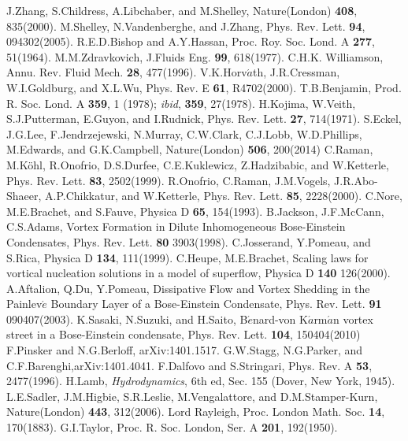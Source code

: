 \documentclass[12pt,a4paper]{report} %
\begin{document}
\begin{thebibliography}{81}
 J.Zhang, S.Childress, A.Libchaber, and M.Shelley, Nature(London) {\bf 408}, 835(2000).
 M.Shelley, N.Vandenberghe, and J.Zhang, Phys. Rev. Lett. {\bf 94}, 094302(2005).
 R.E.D.Bishop and A.Y.Hassan, Proc. Roy. Soc. Lond. A {\bf 277}, 51(1964).
 M.M.Zdravkovich, J.Fluids Eng. {\bf 99}, 618(1977).
 C.H.K. Williamson, Annu. Rev. Fluid Mech. {\bf 28}, 477(1996).
 V.K.Horv$\acute{a}$th, J.R.Cressman, W.I.Goldburg, and X.L.Wu, Phys. Rev. E {\bf 61}, R4702(2000).
 T.B.Benjamin, Prod. R. Soc. Lond. A {\bf 359}, 1 (1978); {\it ibid}, {\bf 359}, 27(1978).
 H.Kojima, W.Veith, S.J.Putterman, E.Guyon, and I.Rudnick, Phys. Rev. Lett. {\bf 27}, 714(1971).
 S.Eckel, J.G.Lee, F.Jendrzejewski, N.Murray, C.W.Clark, C.J.Lobb, W.D.Phillips, M.Edwards, and G.K.Campbell, Nature(London) {\bf 506}, 200(2014)
 C.Raman, M.K\"{o}hl, R.Onofrio, D.S.Durfee, C.E.Kuklewicz, Z.Hadzibabic, and W.Ketterle, Phys. Rev. Lett. {\bf 83}, 2502(1999).
 R.Onofrio, C.Raman, J.M.Vogels, J.R.Abo-Shaeer, A.P.Chikkatur, and W.Ketterle, Phys. Rev. Lett. {\bf 85}, 2228(2000).
 C.Nore, M.E.Brachet, and S.Fauve, Physica D {\bf 65}, 154(1993).
 B.Jackson, J.F.McCann, C.S.Adams, Vortex Formation in Dilute Inhomogeneous Bose-Einstein Condensates, Phys. Rev. Lett. {\bf 80} 3903(1998).
 C.Josserand, Y.Pomeau, and S.Rica, Physica D {\bf 134}, 111(1999).
 C.Heupe, M.E.Brachet, Scaling laws for vortical nucleation solutions in a model of superflow, Physica D {\bf 140} 126(2000).
 A.Aftalion, Q.Du, Y.Pomeau, Dissipative Flow and Vortex Shedding in the Painlev$\acute{e}$ Boundary Layer of a Bose-Einstein Condensate, Phys. Rev. Lett. {\bf 91} 090407(2003).
 K.Sasaki, N.Suzuki, and H.Saito, B$\acute{e}$nard-von K$\acute{a}$rm$\acute{a}$n vortex street in a Bose-Einstein condensate, Phys. Rev. Lett. {\bf 104}, 150404(2010)
 F.Pinsker and N.G.Berloff, arXiv:1401.1517.
 G.W.Stagg, N.G.Parker, and C.F.Barenghi,arXiv:1401.4041.
 F.Dalfovo and S.Stringari, Phys. Rev. A {\bf 53}, 2477(1996).
 H.Lamb, {\it Hydrodynamics}, 6th ed, Sec. 155 (Dover, New York, 1945).
 L.E.Sadler, J.M.Higbie, S.R.Leslie, M.Vengalattore, and D.M.Stamper-Kurn, Nature(London) {\bf 443}, 312(2006).
 Lord Rayleigh, Proc. London Math. Soc. {\bf 14}, 170(1883).
 G.I.Taylor, Proc. R. Soc. London, Ser. A {\bf 201}, 192(1950).

\end{thebibliography}
\end{document}
